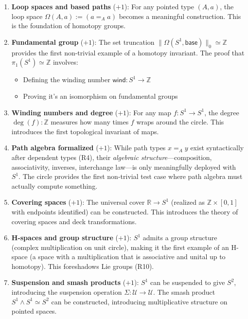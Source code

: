 \documentclass[11pt]{article}
\theoremstyle{definition}
\begin{document}
\begin{enumerate}
\item \textbf{Loop spaces and based paths} ($+1$): For any pointed type $(A, a)$, the loop space $\Omega(A, a) := (a =_A a)$ becomes a meaningful construction. This is the foundation of homotopy groups.

\item \textbf{Fundamental group} ($+1$): The set truncation $\|\Omega(S^1, \mathsf{base})\|_0 \simeq \mathbb{Z}$ provides the first non-trivial example of a homotopy invariant. The proof that $\pi_1(S^1) \simeq \mathbb{Z}$ involves:
\begin{itemize}
\item Defining the winding number $\mathsf{wind} : S^1 \to \mathbb{Z}$
\item Proving it's an isomorphism on fundamental groups
\end{itemize}

\item \textbf{Winding numbers and degree} ($+1$): For any map $f : S^1 \to S^1$, the degree $\deg(f) : \mathbb{Z}$ measures how many times $f$ wraps around the circle. This introduces the first topological invariant of maps.

\item \textbf{Path algebra formalized} ($+1$): While path types $x =_A y$ exist syntactically after dependent types (R4), their \emph{algebraic structure}—composition, associativity, inverses, interchange law—is only meaningfully deployed with $S^1$. The circle provides the first non-trivial test case where path algebra must actually compute something.

\item \textbf{Covering spaces} ($+1$): The universal cover $\mathbb{R} \to S^1$ (realized as $\mathbb{Z} \times [0,1]$ with endpoints identified) can be constructed. This introduces the theory of covering spaces and deck transformations.

\item \textbf{H-spaces and group structure} ($+1$): $S^1$ admits a group structure (complex multiplication on unit circle), making it the first example of an H-space (a space with a multiplication that is associative and unital up to homotopy). This foreshadows Lie groups (R10).

\item \textbf{Suspension and smash products} ($+1$): $S^1$ can be suspended to give $S^2$, introducing the suspension operation $\Sigma : \mathcal{U} \to \mathcal{U}$. The smash product $S^1 \wedge S^1 \simeq S^2$ can be constructed, introducing multiplicative structure on pointed spaces.
\end{enumerate}
\end{document}
